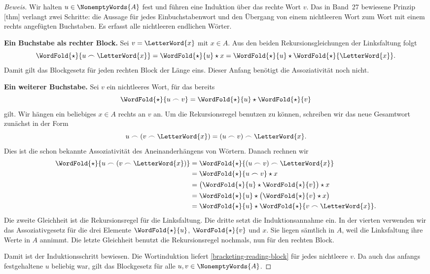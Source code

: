 \begin{proof}[Beweis]
Wir halten \(u\in\NonemptyWords{A}\) fest und führen eine
Induktion über das rechte Wort \(v\). Das in Band~27 bewiesene
Prinzip [thm] verlangt zwei
Schritte: die Aussage für jedes Einbuchstabenwort und den Übergang
von einem nichtleeren Wort zum Wort mit einem rechts angefügten
Buchstaben. Es erfasst alle nichtleeren endlichen Wörter.

\medskip\noindent\textbf{Ein Buchstabe als rechter Block.}
Sei \(v=\LetterWord{x}\) mit \(x\in A\). Aus den beiden
Rekursionsgleichungen der Linksfaltung folgt
\[
  \WordFold{\star}{u\frown\LetterWord{x}}
    =\WordFold{\star}{u}\star x
    =\WordFold{\star}{u}\star\WordFold{\star}{\LetterWord{x}}.
\]
Damit gilt das Blockgesetz für jeden rechten Block der Länge eins.
Dieser Anfang benötigt die Assoziativität noch nicht.

\medskip\noindent\textbf{Ein weiterer Buchstabe.}
Sei \(v\) ein nichtleeres Wort, für das bereits
\[
  \WordFold{\star}{u\frown v}
    =\WordFold{\star}{u}\star\WordFold{\star}{v}
\]
gilt. Wir hängen ein beliebiges \(x\in A\) rechts an \(v\) an.
Um die Rekursionsregel benutzen zu können, schreiben wir das neue
Gesamtwort zunächst in der Form
\[
  u\frown(v\frown\LetterWord{x})
    =(u\frown v)\frown\LetterWord{x}.
\]
Dies ist die schon bekannte Assoziativität des Aneinanderhängens von
Wörtern. Danach rechnen wir
\[
  \begin{aligned}
    \WordFold{\star}{u\frown(v\frown\LetterWord{x})}
      &=\WordFold{\star}{(u\frown v)\frown\LetterWord{x}}\\
      &=\WordFold{\star}{u\frown v}\star x\\
      &=\bigl(\WordFold{\star}{u}\star\WordFold{\star}{v}\bigr)
          \star x\\
      &=\WordFold{\star}{u}\star
          \bigl(\WordFold{\star}{v}\star x\bigr)\\
      &=\WordFold{\star}{u}\star
          \WordFold{\star}{v\frown\LetterWord{x}}.
  \end{aligned}
\]
Die zweite Gleichheit ist die Rekursionsregel für die Linksfaltung.
Die dritte setzt die Induktionsannahme ein. In der vierten verwenden
wir das Assoziativgesetz für die drei Elemente
\(\WordFold{\star}{u}\), \(\WordFold{\star}{v}\) und \(x\).
Sie liegen sämtlich in \(A\), weil die Linksfaltung ihre Werte
in \(A\) annimmt. Die letzte Gleichheit benutzt die Rekursionsregel
nochmals, nun für den rechten Block.

Damit ist der Induktionsschritt bewiesen. Die Wortinduktion liefert
\eqref{bracketing-reading-block} für jedes nichtleere \(v\).
Da auch das anfangs festgehaltene \(u\) beliebig war, gilt das
Blockgesetz für alle \(u,v\in\NonemptyWords{A}\).
\end{proof}

